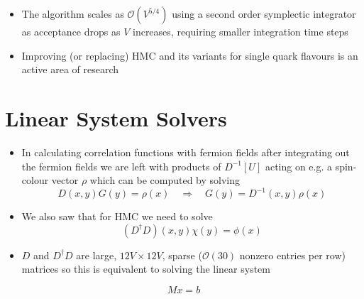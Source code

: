 \begin{itemize}
\begin{equation}
F_{\mu}=-\frac{\partial H}{\partial Q_{\mu}}=-\frac{\partial}{\partial Q_{\mu}}\left[S[Q]+\phi\left(D^{\dagger} D\right)^{-1} \phi\right]
\end{equation}
and the latter term involves evaluating $\chi = (D^\dagger D)^{-1}\phi$ which is equivalent to solving $D^\dagger D \chi = \phi$; this is the most computationally demanding part of HMC

    \item The algorithm scales as $\mathcal{O}(V^{5/4})$ using a second order symplectic integrator as acceptance drops as $V$ increases, requiring smaller integration time steps
    \item Improving (or replacing) HMC and its variants for single quark flavours is an active area of research
\end{itemize}

\section{Linear System Solvers}
\begin{itemize}
    \item In calculating correlation functions with fermion fields after integrating out the fermion fields we are left with products of $D^{-1}[U]$ acting on e.g. a spin-colour vector $\rho$ which can be computed by solving
\begin{equation}
    D(x,y) G(y) = \rho(x) \quad \Longrightarrow \quad G(y) = D^{-1}(x,y)\rho(x)
\end{equation}
\item We also saw that for HMC we need to solve
\begin{equation}
    (D^\dagger D)(x,y) \chi(y) = \phi(x)
\end{equation}
   \item $D$ and $D^\dagger D$ are large, $12 V \times 12 V$, sparse ($\mathcal{O}(30)$ nonzero entries per row) matrices so this is equivalent to solving the linear system
\end{itemize}
\begin{equation}
    M x = b
\end{equation}


